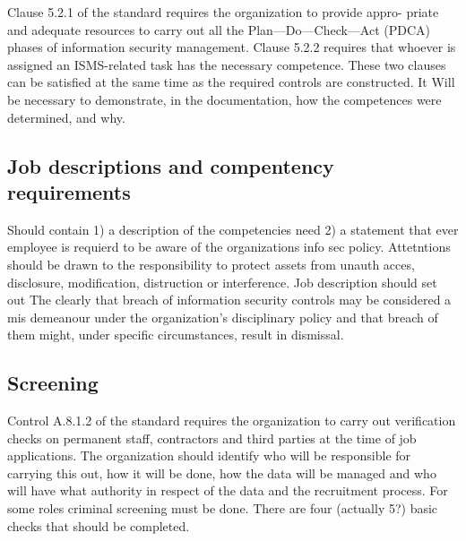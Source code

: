 Clause 5.2.1 of the standard requires the organization to provide appro-
priate and adequate resources to carry out all the Plan—Do—Check—Act
(PDCA) phases of information security management. Clause 5.2.2 requires
that whoever is assigned an ISMS-related task has the necessary competence.
These two clauses can be satisfied at the same time as the required controls are
constructed. It Will be necessary to demonstrate, in the documentation, how
the competences were determined, and why.

\subsection{Job descriptions and compentency requirements}
Should contain 1) a description of the competencies need 2) a statement that 
ever employee is requierd to be aware of the organizations info sec policy. 
Attetntions should be drawn to the responsibility to protect assets from unauth
acces, disclosure, modification, distruction or interference. Job description 
should set out The clearly that breach of information security controls may be 
considered a mis demeanour under the organization’s disciplinary policy and that 
breach of them might, under specific circumstances, result in dismissal.

\subsection{Screening}
Control A.8.1.2 of the standard requires the organization to carry out 
verification checks on permanent staff, contractors and third parties at the time of
job applications. The organization should identify who will be responsible for
carrying this out, how it will be done, how the data will be managed and who
will have what authority in respect of the data and the recruitment process.
For some roles criminal screening must be done. There are four (actually 5?) 
basic checks that should be completed.

